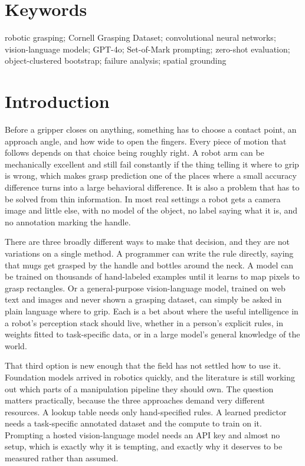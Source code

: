 \documentclass[12pt,letterpaper]{article}
\begin{document}
\section*{Keywords}
robotic grasping; Cornell Grasping Dataset; convolutional neural networks;
vision-language models; GPT-4o; Set-of-Mark prompting; zero-shot evaluation;
object-clustered bootstrap; failure analysis; spatial grounding

\newpage
\tableofcontents
\newpage
\section{Introduction}

Before a gripper closes on anything, something has to choose a contact
point, an approach angle, and how wide to open the fingers. Every piece
of motion that follows depends on that choice being roughly right. A
robot arm can be mechanically excellent and still fail constantly if
the thing telling it where to grip is wrong, which makes grasp
prediction one of the places where a small accuracy difference turns
into a large behavioral difference. It is also a problem that has to be
solved from thin information. In most real settings a robot gets a
camera image and little else, with no model of the object, no label
saying what it is, and no annotation marking the handle.

There are three broadly different ways to make that decision, and they
are not variations on a single method. A programmer can write the rule
directly, saying that mugs get grasped by the handle and bottles around
the neck. A model can be trained on thousands of hand-labeled examples
until it learns to map pixels to grasp rectangles. Or a general-purpose
vision-language model, trained on web text and images and never shown a
grasping dataset, can simply be asked in plain language where to grip.
Each is a bet about where the useful intelligence in a robot's
perception stack should live, whether in a person's explicit rules, in
weights fitted to task-specific data, or in a large model's general
knowledge of the world.

That third option is new enough that the field has not settled how to
use it. Foundation models arrived in robotics quickly, and the
literature is still working out which parts of a manipulation pipeline
they should own. The question matters practically, because the three
approaches demand very different resources. A lookup table needs only
hand-specified rules. A learned predictor needs a task-specific
annotated dataset and the compute to train on it. Prompting a hosted
vision-language model needs an API key and almost no setup, which is
exactly why it is tempting, and exactly why it deserves to be measured
rather than assumed.
\end{document}
